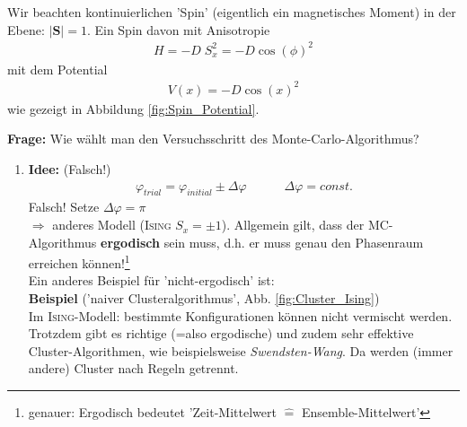\documentclass[12pt]{article}
\begin{document}
Wir beachten kontinuierlichen 'Spin' (eigentlich ein magnetisches Moment) in der Ebene: $\vert \mathbf{S} \vert = 1$. Ein Spin davon mit Anisotropie \begin{align*}
H=-D \; S_x^2 = -D \cos(\phi)^2
\end{align*} mit dem Potential
\begin{align*}
V(x) = -D \cos(x)^2
\end{align*}
wie gezeigt in Abbildung \ref{fig:Spin_Potential}.

\textbf{Frage:} Wie wählt man den Versuchsschritt des Monte-Carlo-Algorithmus?
\begin{enumerate}

\item \textbf{Idee:} (Falsch!)
\begin{align*}
\varphi_{trial} = \varphi_{initial} \pm \Delta \varphi \quad \quad \quad \Delta \varphi = const.
\end{align*}
Falsch! Setze $\Delta \varphi = \pi$ \\
$ \Rightarrow$ anderes Modell (\textsc{Ising} $S_x = \pm 1$). Allgemein gilt, dass der MC-Algorithmus \textbf{ergodisch} sein muss, d.h. er muss genau den Phasenraum erreichen können!\footnote{genauer: Ergodisch bedeutet 'Zeit-Mittelwert $\widehat{=}$ Ensemble-Mittelwert'} \\
Ein anderes Beispiel für 'nicht-ergodisch' ist: \\
\textbf{Beispiel} ('naiver Clusteralgorithmus', Abb. \ref{fig:Cluster_Ising}) \\
Im \textsc{Ising}-Modell: bestimmte Konfigurationen können nicht vermischt werden. Trotzdem gibt es richtige (=also ergodische) und zudem sehr effektive Cluster-Algorithmen, wie beispielsweise \textit{Swendsten-Wang}. Da werden (immer andere) Cluster nach Regeln getrennt. 


\end{enumerate}
\end{document}
